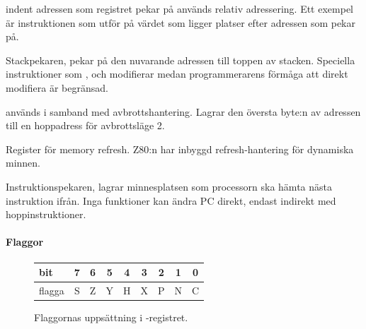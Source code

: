 \documentclass[main.tex]{subfiles}
\begin{document}
\begin{labeling}{indent}
    adressen som registret pekar på används relativ adressering. Ett exempel är
    instruktionen  som utför  på värdet som ligger
     platser efter adressen som  pekar på.
\item[\mono{SP}]
    Stackpekaren, pekar på den nuvarande adressen till toppen av stacken.
    Speciella instruktioner som ,  och 
    modifierar  medan programmerarens förmåga att direkt modifiera
     är begränsad.
\item[\mono{I}]
     används i samband med avbrottshantering. Lagrar den översta byte:n
    av adressen till en hoppadress för avbrottsläge 2.
\item[\mono{R}]
    Register för memory refresh. Z80:n har inbyggd refresh-hantering för
    dynamiska minnen.
\item[\mono{PC}]
    Instruktionspekaren, lagrar minnesplatsen som processorn ska hämta nästa
    instruktion ifrån. Inga funktioner kan ändra PC direkt, endast indirekt med
    hoppinstruktioner.
\end{labeling}

\paragraph{Flaggor}

\begin{figure}
    \center
    \begin{tabular}{|l|c|c|c|c|c|c|c|c|}
        \hline
        bit     & 7 & 6 & 5 & 4 & 3 & 2 & 1 & 0 \\ \hline
        flagga  & S & Z & Y & H & X & P & N & C \\ \hline
    \end{tabular}
    \caption{Flaggornas uppsättning i -registret.}
    \label{fig:flags}
\end{figure}
\end{document}
